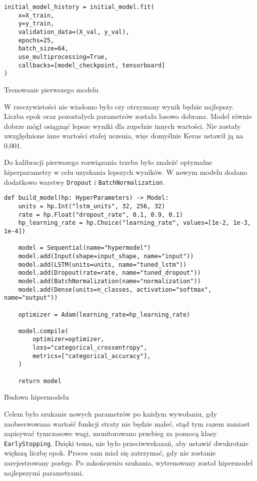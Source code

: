 \begin{listing}[H]
    \color{white}
    \begin{verbatim}
initial_model_history = initial_model.fit(
    x=X_train,
    y=y_train,
    validation_data=(X_val, y_val),
    epochs=25,
    batch_size=64,
    use_multiprocessing=True,
    callbacks=[model_checkpoint, tensorboard]
)
    \end{verbatim}
    \caption{Trenowanie pierwszego modelu}
    \label{lst:initial-model-training}
\end{listing}

W rzeczywistości nie wiadomo było czy otrzymany wynik będzie najlepszy. Liczba epok oraz pozostałych parametrów została losowo dobrana. Model równie dobrze mógł osiągnąć lepsze wyniki dla zupełnie innych wartości. Nie zostały uwzględnione inne wartości stałej uczenia, więc domyślnie Keras ustawił ją na $0.001$.

Do kalibracji pierwszego rozwiązania trzeba było znaleźć optymalne hiperparametry w celu uzyskania lepszych wyników. W nowym modelu dodano dodatkowo warstwy \texttt{Dropout} i \texttt{BatchNormalization}.

\begin{listing}[H]
    \color{white}
    \begin{verbatim}
def build_model(hp: HyperParameters) -> Model:
    units = hp.Int("lstm_units", 32, 256, 32)
    rate = hp.Float("dropout_rate", 0.1, 0.9, 0.1)
    hp_learning_rate = hp.Choice("learning_rate", values=[1e-2, 1e-3, 1e-4])

    model = Sequential(name="hypermodel")
    model.add(Input(shape=input_shape, name="input"))
    model.add(LSTM(units=units, name="tuned_lstm"))
    model.add(Dropout(rate=rate, name="tuned_dropout"))
    model.add(BatchNormalization(name="normalization"))
    model.add(Dense(units=n_classes, activation="softmax", name="output"))

    optimizer = Adam(learning_rate=hp_learning_rate)

    model.compile(
        optimizer=optimizer,
        loss="categorical_crossentropy",
        metrics=["categorical_accuracy"],
    )

    return model
    \end{verbatim}
    \caption{Budowa hipermodelu}
    \label{lst:hypermodel-build}
\end{listing}

Celem było szukanie nowych parametrów po każdym wywołaniu, gdy zaobserwowana wartość funkcji straty nie będzie maleć, stąd tym razem zamiast zapisywać tymczasowe wagi, monitorowano przebieg za pomocą klasy \texttt{EarlyStopping}. Dzięki temu, nie było przeciwwskazań, aby ustawić dwukrotnie większą liczbę epok. Proces sam miał się zatrzymać, gdy nie zostanie zarejestrowany postęp. Po zakończeniu szukania, wytrenowany został hipermodel najlepszymi parametrami.

